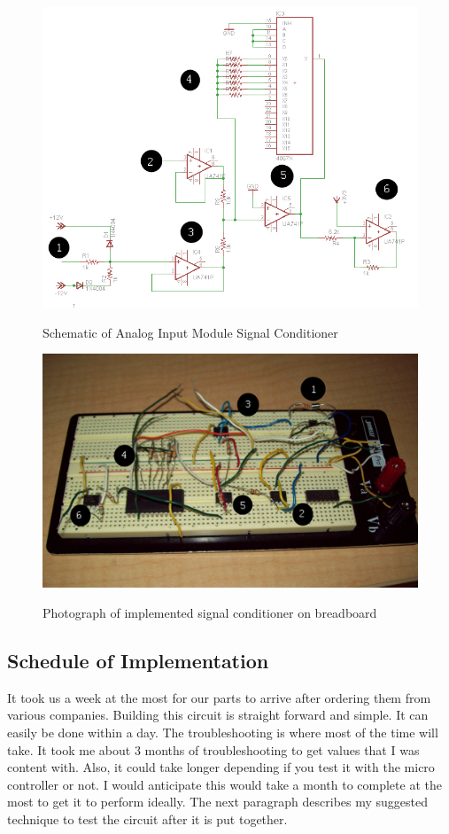 \begin{figure}[hbp]
\caption[Conditioner Schematic]{Schematic of Analog Input Module Signal Conditioner}
\includegraphics[width=5in]{sub_analog_sch.jpg}
\label{fig:analog schematic}
\end{figure}

\begin{figure}[hbp]
\caption{Photograph of implemented signal conditioner on breadboard}
\includegraphics[width=5in]{sub_analog_hw.jpg}
\label{fig:analog breadboard}
\end{figure}

\subsection{Schedule of Implementation}
It took us a week at the most for our parts to arrive after ordering them from
 various companies. Building this circuit is straight forward and simple. It
 can easily be done within a day. The troubleshooting is where most of the
 time will take. It took me about 3 months of troubleshooting to get values
 that I was content with. Also, it could take longer depending if you test it
 with the micro controller or not. I would anticipate this would take a month
 to complete at the most to get it to perform ideally. The next paragraph 
describes my suggested technique to test the circuit after it is put together.

